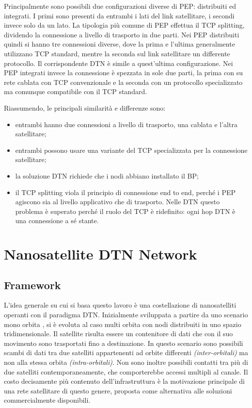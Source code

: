 \documentclass[12pt,a4paper,oneside]{book}
\begin{document}
		Principalmente sono possibili due configurazioni diverse di PEP: distribuiti ed integrati. I primi sono presenti da entrambi i lati del link satellitare, i secondi invece solo da un lato. 
		La tipologia più comune di PEP effettua il TCP splitting, dividendo la connessione a livello di trasporto in due parti. Nei PEP distribuiti quindi si hanno tre connessioni diverse, dove la prima e l'ultima generalmente utilizzano TCP standard, mentre la seconda sul link satellitare un differente protocollo.
		Il corrispondente DTN è simile a quest'ultima configurazione.
		Nei PEP integrati invece la connessione è spezzata in sole due parti, la prima con su rete cablata con TCP convenzionale e la seconda con un protocollo specializzato ma comunque compatibile con il TCP standard.
		
		Riassumendo, le principali similarità e differenze sono:
		\begin{itemize}
			\item entrambi hanno due connessioni a livello di trasporto, una cablata e l'altra satellitare;
			\item entrambi possono usare una variante del TCP specializzata per la connessione satellitare;
			\item la soluzione DTN richiede che i nodi abbiano installato il BP;
			\item il TCP splitting viola il principio di connessione end to end, perché i PEP agiscono sia al livello applicativo che di trasporto. Nelle DTN questo problema è superato perché il ruolo del TCP è ridefinito: ogni hop DTN è una connessione a sé stante.
 		\end{itemize}
		
		
	
	\chapter{Nanosatellite DTN Network}
		
		\section{Framework}	

		L'idea generale su cui si basa questo lavoro è una costellazione di nanosatelliti operanti con il paradigma DTN. Inizialmente sviluppata a partire da uno scenario mono orbita \cite{cello2014hot}, si è evoluta al caso multi orbita con nodi distribuiti in uno spazio tridimensionale. Il satellite risulta essere un contenitore di dati che con il suo movimento sono trasportati fino a destinazione. In questo scenario sono possibili scambi di dati tra due satelliti appartenenti ad orbite differenti \textit{(inter-orbitali)} ma non alla stessa orbita \textit{(intra-orbitali)}. Non sono inoltre possibili contatti tra più di due satelliti contemporaneamente, che comporterebbe accessi multipli al canale. Il costo decisamente più contenuto dell'infrastruttura è la motivazione principale di una rete satellitare di questo genere, proposta come alternativa alle soluzioni commercialmente disponibili. 
		
\end{document}
